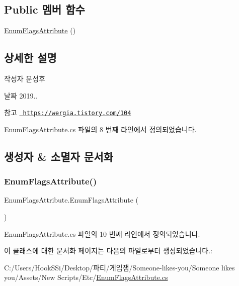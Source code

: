 \subsection*{Public 멤버 함수}
\begin{DoxyCompactItemize}
\item 
\mbox{\hyperlink{class_enum_flags_attribute_a5b29527c68c91ff6fc3dd9e26c2253b8}{Enum\+Flags\+Attribute}} ()
\end{DoxyCompactItemize}


\subsection{상세한 설명}
\begin{DoxyAuthor}{작성자}
문성후 
\end{DoxyAuthor}
\begin{DoxyDate}{날짜}
2019.. 
\end{DoxyDate}
\begin{DoxySeeAlso}{참고}
\href{https://wergia.tistory.com/104}{\texttt{ https\+://wergia.\+tistory.\+com/104}} 
\end{DoxySeeAlso}


Enum\+Flags\+Attribute.\+cs 파일의 8 번째 라인에서 정의되었습니다.



\subsection{생성자 \& 소멸자 문서화}
\mbox{\label{class_enum_flags_attribute_a5b29527c68c91ff6fc3dd9e26c2253b8}} 
\subsubsection{\texorpdfstring{EnumFlagsAttribute()}{EnumFlagsAttribute()}}
{\footnotesize\ttfamily Enum\+Flags\+Attribute.\+Enum\+Flags\+Attribute (\begin{DoxyParamCaption}{ }\end{DoxyParamCaption})\hspace{0.3cm}{\ttfamily [inline]}}



Enum\+Flags\+Attribute.\+cs 파일의 10 번째 라인에서 정의되었습니다.


\begin{DoxyCode}{0}

\end{DoxyCode}


이 클래스에 대한 문서화 페이지는 다음의 파일로부터 생성되었습니다.\+:\begin{DoxyCompactItemize}
\item 
C\+:/\+Users/\+Hook\+S\+Si/\+Desktop/파티/게임잼/\+Someone-\/likes-\/you/\+Someone likes you/\+Assets/\+New Scripts/\+Etc/\mbox{\hyperlink{_enum_flags_attribute_8cs}{Enum\+Flags\+Attribute.\+cs}}\end{DoxyCompactItemize}
